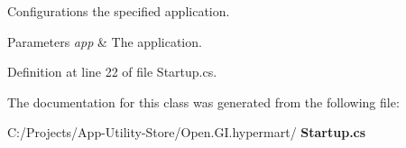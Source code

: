 Configurations the specified application. 


\begin{DoxyParams}{Parameters}
{\em app} & The application.\\
\hline
\end{DoxyParams}


Definition at line 22 of file Startup.\+cs.



The documentation for this class was generated from the following file\+:\begin{DoxyCompactItemize}
\item 
C\+:/\+Projects/\+App-\/\+Utility-\/\+Store/\+Open.\+G\+I.\+hypermart/\textbf{ Startup.\+cs}\end{DoxyCompactItemize}
